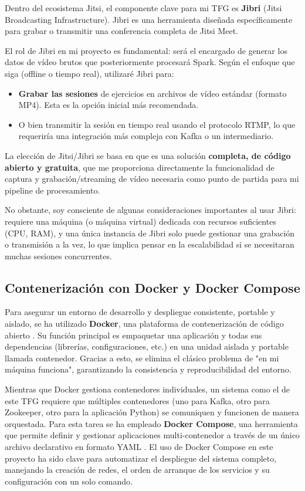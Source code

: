 Dentro del ecosistema Jitsi, el componente clave para mi TFG es \textbf{Jibri} (Jitsi Broadcasting Infrastructure). Jibri es una herramienta diseñada específicamente para grabar o transmitir una conferencia completa de Jitsi Meet.

El rol de Jibri en mi proyecto es fundamental: será el encargado de generar los datos de vídeo brutos que posteriormente procesará Spark. Según el enfoque que siga (offline o tiempo real), utilizaré Jibri para:
\begin{itemize}
    \item \textbf{Grabar las sesiones} de ejercicios en archivos de vídeo estándar (formato MP4). Esta es la opción inicial más recomendada.
    \item O bien transmitir la sesión en tiempo real usando el protocolo RTMP, lo que requeriría una integración más compleja con Kafka o un intermediario.
\end{itemize}

La elección de Jitsi/Jibri se basa en que es una solución \textbf{completa, de código abierto y gratuita}, que me proporciona directamente la funcionalidad de captura y grabación/streaming de vídeo necesaria como punto de partida para mi pipeline de procesamiento.

No obstante, soy consciente de algunas consideraciones importantes al usar Jibri: requiere una máquina (o máquina virtual) dedicada con recursos suficientes (CPU, RAM), y una única instancia de Jibri solo puede gestionar una grabación o transmisión a la vez, lo que implica pensar en la escalabilidad si se necesitaran muchas sesiones concurrentes.


\subsection{Contenerización con Docker y Docker Compose}

Para asegurar un entorno de desarrollo y despliegue consistente, portable y aislado, se ha utilizado \textbf{Docker}, una plataforma de contenerización de código abierto \cite{docker_docs}. Su función principal es empaquetar una aplicación y todas sus dependencias (librerías, configuraciones, etc.) en una unidad aislada y portable llamada contenedor. Gracias a esto, se elimina el clásico problema de "en mi máquina funciona", garantizando la consistencia y reproducibilidad del entorno.

Mientras que Docker gestiona contenedores individuales, un sistema como el de este TFG requiere que múltiples contenedores (uno para Kafka, otro para Zookeeper, otro para la aplicación Python) se comuniquen y funcionen de manera orquestada. Para esta tarea se ha empleado \textbf{Docker Compose}, una herramienta que permite definir y gestionar aplicaciones multi-contenedor a través de un único archivo declarativo en formato YAML \cite{docker_docs}. El uso de Docker Compose en este proyecto ha sido clave para automatizar el despliegue del sistema completo, manejando la creación de redes, el orden de arranque de los servicios y su configuración con un solo comando.

